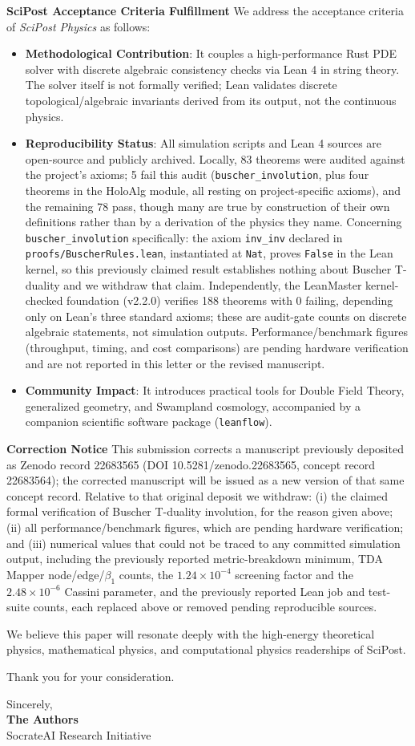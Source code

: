 \documentclass[11pt]{letter}
\begin{document}
\noindent\textbf{SciPost Acceptance Criteria Fulfillment}
We address the acceptance criteria of \textit{SciPost Physics} as follows:
\begin{itemize}
    \item \textbf{Methodological Contribution}: It couples a high-performance Rust PDE solver with discrete algebraic consistency checks via Lean 4 in string theory. The solver itself is not formally verified; Lean validates discrete topological/algebraic invariants derived from its output, not the continuous physics.
    \item \textbf{Reproducibility Status}: All simulation scripts and Lean 4 sources are open-source and publicly archived. Locally, 83 theorems were audited against the project's axioms; 5 fail this audit (\texttt{buscher\_involution}, plus four theorems in the HoloAlg module, all resting on project-specific axioms), and the remaining 78 pass, though many are true by construction of their own definitions rather than by a derivation of the physics they name. Concerning \texttt{buscher\_involution} specifically: the axiom \texttt{inv\_inv} declared in \texttt{proofs/BuscherRules.lean}, instantiated at \texttt{Nat}, proves \texttt{False} in the Lean kernel, so this previously claimed result establishes nothing about Buscher T-duality and we withdraw that claim. Independently, the LeanMaster kernel-checked foundation (v2.2.0) verifies 188 theorems with 0 failing, depending only on Lean's three standard axioms; these are audit-gate counts on discrete algebraic statements, not simulation outputs. Performance/benchmark figures (throughput, timing, and cost comparisons) are pending hardware verification and are not reported in this letter or the revised manuscript.
    \item \textbf{Community Impact}: It introduces practical tools for Double Field Theory, generalized geometry, and Swampland cosmology, accompanied by a companion scientific software package (\texttt{leanflow}).
\end{itemize}

\noindent\textbf{Correction Notice}
This submission corrects a manuscript previously deposited as Zenodo record 22683565 (DOI 10.5281/zenodo.22683565, concept record 22683564); the corrected manuscript will be issued as a new version of that same concept record. Relative to that original deposit we withdraw: (i) the claimed formal verification of Buscher T-duality involution, for the reason given above; (ii) all performance/benchmark figures, which are pending hardware verification; and (iii) numerical values that could not be traced to any committed simulation output, including the previously reported metric-breakdown minimum, TDA Mapper node/edge/$\beta_1$ counts, the $1.24\times10^{-4}$ screening factor and the $2.48\times10^{-6}$ Cassini parameter, and the previously reported Lean job and test-suite counts, each replaced above or removed pending reproducible sources.

We believe this paper will resonate deeply with the high-energy theoretical physics, mathematical physics, and computational physics readerships of SciPost.

Thank you for your consideration.

\vspace{1.5em}

\noindent Sincerely, \\
\textbf{The Authors} \\
SocrateAI Research Initiative
\end{document}
